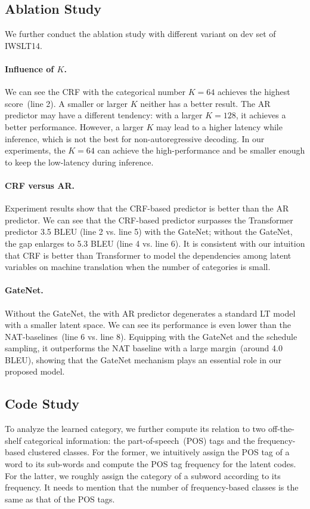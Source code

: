 \subsection{Ablation Study}
We further conduct the ablation study with different \method variant on dev set of IWSLT14. 

\paragraph{Influence of $K$.}
We can see the CRF with the categorical number $K=64$ achieves the highest score~(line 2).  
A smaller or larger $K$ neither has a better result. 
The AR predictor may have a different tendency: with a larger $K=128$, it achieves a better performance. 
However, a larger $K$ may lead to a higher latency while inference, which is not the best for non-autoregressive decoding.
In our experiments, the $K=64$ can achieve the high-performance and be smaller enough to keep the low-latency during inference. 

\paragraph{CRF versus AR.} 
Experiment results show that the CRF-based predictor is better than the AR predictor. 
We can see that the CRF-based predictor surpasses the Transformer predictor 3.5 BLEU (line 2 vs. line 5) with the GateNet;
without the GateNet, the gap enlarges to 5.3 BLEU (line 4 vs. line 6). 
It is consistent with our intuition that CRF is better than Transformer to model the dependencies among latent variables on machine translation when the number of categories is small. 

\paragraph{GateNet.} 
Without the GateNet, the \method with AR predictor degenerates a standard LT model with a smaller latent space. 
We can see its performance is even lower than the NAT-baselines~(line 6 vs. line 8). 
Equipping with the GateNet and the schedule sampling, it outperforms the NAT baseline with a large margin~(around 4.0 BLEU), showing that the GateNet mechanism plays an essential role in our proposed model.

\subsection{Code Study}
To analyze the learned category, we further compute its relation to two off-the-shelf categorical information: the part-of-speech~(POS) tags and the frequency-based clustered classes.
For the former, we intuitively assign the POS tag of a word to its sub-words and compute the POS tag frequency for the latent codes. 
For the latter, we roughly assign the category of a subword according to its frequency.
It needs to mention that the number of frequency-based classes is the same as that of the POS tags.

